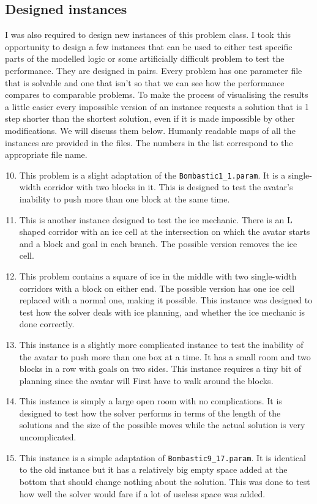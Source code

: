 \documentclass[british]{article}
\newcommand{\code}[1]{\texttt{#1}}
\begin{document}
	\subsection{Designed instances}
	I was also required to design new instances of this problem class. I took this opportunity to design a few instances that can be used to either test specific parts of the modelled logic or some artificially difficult problem to test the performance. They are designed in pairs. Every problem has one parameter file that is solvable and one that isn't so that we can see how the performance compares to comparable problems. To make the process of visualising the results a little easier every impossible version of an instance requests a solution that is 1 step shorter than the shortest solution, even if it is made impossible by other modifications. We will discuss them below. Humanly readable maps of all the instances are provided in the files. The numbers in the list correspond to the appropriate file name. 
	\begin{enumerate}[1)]
		\setcounter{enumi}{9}
		\item This problem is a slight adaptation of the \code{Bombastic1\_1.param}. It is a single-width corridor with two blocks in it. This is designed to test the avatar's inability to push more than one block at the same time.
		\item This is another instance designed to test the ice mechanic. There is an L shaped corridor with an ice cell at the intersection on which the avatar starts and a block and goal in each branch. The possible version removes the ice cell. 
		\item This problem contains a square of ice in the middle with two single-width corridors with a block on either end. The possible version has one ice cell replaced with a normal one, making it possible. This instance was designed to test how the solver deals with ice planning, and whether the ice mechanic is done correctly. 
		\item This instance is a slightly more complicated instance to test the inability of the avatar to push more than one box at a time. It has a small room and two blocks in a row with goals on two sides. This instance requires a tiny bit of planning since the avatar will First have to walk around the blocks.
		\item This instance is simply a large open room with no complications. It is designed to test how the solver performs in terms of the length of the solutions and the size of the possible moves while the actual solution is very uncomplicated.
		\item  This instance is a simple adaptation of \code{Bombastic9\_17.param}.  It is identical to the old instance but it has a relatively big empty space added at the bottom that should change nothing about the solution. This was done to test how well the solver would fare if a lot of useless space was added.
	\end{enumerate}
	
\end{document}
